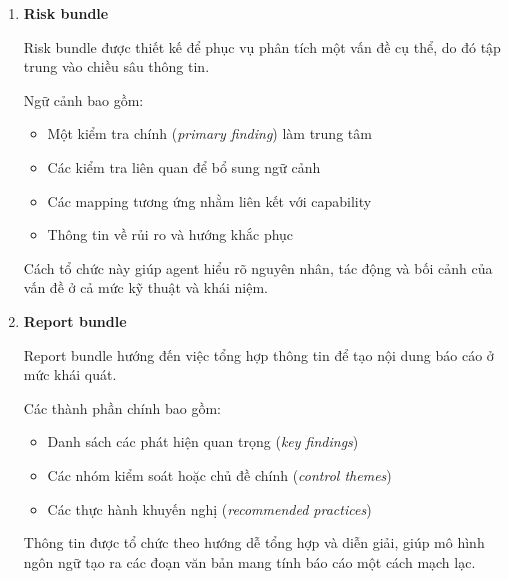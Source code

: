 \begin{enumerate}
    Đặc điểm của bundle này:
    \begin{itemize}
        \item Ưu tiên đa dạng hóa các kiểm tra theo các nhóm intent khác nhau
        \item Đảm bảo độ bao phủ về service và domain
        \item Không đi sâu vào chi tiết rủi ro hoặc diễn giải
    \end{itemize}

    Thay vì chỉ chọn các kết quả có điểm số cao nhất, hệ thống áp dụng chiến lược lựa chọn nhằm cân bằng giữa mức độ liên quan và độ đa dạng, giúp tránh bỏ sót các khía cạnh quan trọng trong quá trình lập kế hoạch.

    \item \textbf{Risk bundle}

    Risk bundle được thiết kế để phục vụ phân tích một vấn đề cụ thể, do đó tập trung vào chiều sâu thông tin.

    Ngữ cảnh bao gồm:
    \begin{itemize}
        \item Một kiểm tra chính (\textit{primary finding}) làm trung tâm
        \item Các kiểm tra liên quan để bổ sung ngữ cảnh
        \item Các mapping tương ứng nhằm liên kết với capability
        \item Thông tin về rủi ro và hướng khắc phục
    \end{itemize}

    Cách tổ chức này giúp agent hiểu rõ nguyên nhân, tác động và bối cảnh của vấn đề ở cả mức kỹ thuật và khái niệm.

    \item \textbf{Report bundle}

    Report bundle hướng đến việc tổng hợp thông tin để tạo nội dung báo cáo ở mức khái quát.

    Các thành phần chính bao gồm:
    \begin{itemize}
        \item Danh sách các phát hiện quan trọng (\textit{key findings})
        \item Các nhóm kiểm soát hoặc chủ đề chính (\textit{control themes})
        \item Các thực hành khuyến nghị (\textit{recommended practices})
    \end{itemize}

    Thông tin được tổ chức theo hướng dễ tổng hợp và diễn giải, giúp mô hình ngôn ngữ tạo ra các đoạn văn bản mang tính báo cáo một cách mạch lạc.


\end{enumerate}
